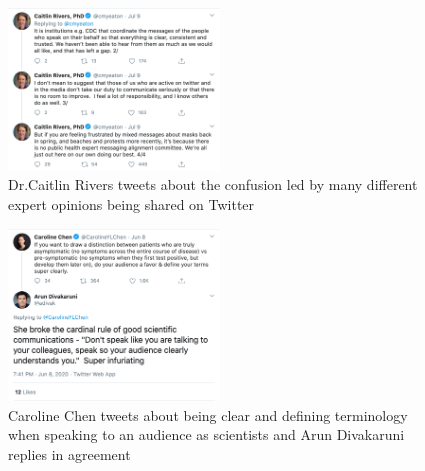 \documentclass[acmsmall,authordraft]{acmart}
\begin{document}
\begin{figure}
  \includegraphics[width=0.5\textwidth]{Pictures/Appendix_Tweets/caitlin rivers tweet2 contd.png}
  \caption{Dr.Caitlin Rivers tweets about the confusion led by many different expert opinions being shared on Twitter}
  \label{caitlin_rivers_tweet2_contd}
\end{figure}

\begin{figure}
  \includegraphics[width=0.5\textwidth]{Pictures/Appendix_Tweets/caroline chen and arun divakaruni tweet.png}
  \caption{Caroline Chen tweets about being clear and defining terminology when speaking to an audience as scientists and Arun Divakaruni replies in agreement}
  \label{caroline_chen_tweet}
\end{figure}
\end{document}
